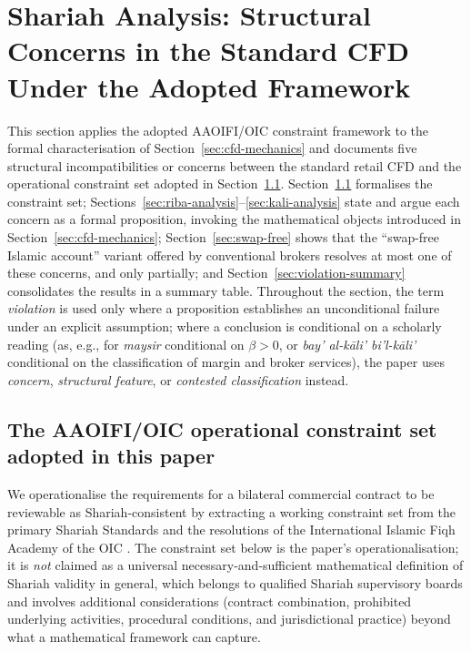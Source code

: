 \documentclass[preprint,12pt,authoryear]{elsarticle}
\theoremstyle{definition}
\begin{document}
\section{Shariah Analysis: Structural Concerns in the Standard
    CFD Under the Adopted Framework}
\label{sec:shariah-analysis}

This section applies the adopted AAOIFI/OIC constraint framework
to the formal characterisation of Section~\ref{sec:cfd-mechanics}
and documents five structural incompatibilities or concerns
between the standard retail CFD and the operational constraint
set adopted in Section~\ref{sec:aaoifi-constraints}.
Section~\ref{sec:aaoifi-constraints} formalises the constraint
set; Sections~\ref{sec:riba-analysis}--\ref{sec:kali-analysis}
state and argue each concern as a formal proposition, invoking the
mathematical objects introduced in
Section~\ref{sec:cfd-mechanics}; Section~\ref{sec:swap-free} shows
that the ``swap-free Islamic account'' variant offered by
conventional brokers resolves at most one of these concerns, and
only partially; and Section~\ref{sec:violation-summary}
consolidates the results in a summary table. Throughout the
section, the term \emph{violation} is used only where a
proposition establishes an unconditional failure under an explicit
assumption; where a conclusion is conditional on a scholarly
reading (as, e.g., for \emph{maysir} conditional on
$\beta > 0$, or \emph{bay' al-k\={a}li' bi'l-k\={a}li'}
conditional on the classification of margin and broker services),
the paper uses \emph{concern}, \emph{structural feature}, or
\emph{contested classification} instead.

\subsection{The AAOIFI/OIC operational constraint set adopted in
    this paper}
\label{sec:aaoifi-constraints}

We operationalise the requirements for a bilateral commercial
contract to be reviewable as Shariah-consistent by extracting a
working constraint set from the primary \citet{AAOIFI2015}
Shariah Standards and the resolutions of the International
Islamic Fiqh Academy of the OIC \citep{OICFiqh63,OICFiqh179}. The
constraint set below is the paper's operationalisation; it is
\emph{not} claimed as a universal necessary-and-sufficient
mathematical definition of Shariah validity in general, which
belongs to qualified Shariah supervisory boards and involves
additional considerations (contract combination, prohibited
underlying activities, procedural conditions, and jurisdictional
practice) beyond what a mathematical framework can capture.
\end{document}
